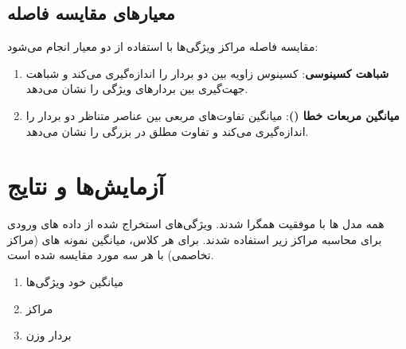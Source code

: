 \documentclass{article}
\begin{document}
\subsection{معیارهای مقایسه فاصله}
مقایسه فاصله مراکز ویژگی‌ها با استفاده از دو معیار انجام می‌شود:
\begin{enumerate}
    \item \textbf{شباهت کسینوسی}: کسینوس زاویه بین دو بردار را اندازه‌گیری می‌کند و شباهت جهت‌گیری بین بردارهای ویژگی را نشان می‌دهد.
    \item \textbf{میانگین مربعات خطا ()}: میانگین تفاوت‌های مربعی بین عناصر متناظر دو بردار را اندازه‌گیری می‌کند و تفاوت مطلق در بزرگی را نشان می‌دهد.
\end{enumerate}

\section{آزمایش‌ها و نتایج}
همه مدل ها با موفقیت همگرا شدند.
ویژگی‌های استخراج شده از داده های ورودی برای محاسبه مراکز زیر استفاده شدند. برای هر کلاس، میانگین نمونه های  (مراکز تخاصمی) با هر سه مورد مقایسه شده است.

\begin{enumerate}
    \item میانگین خود ویژگی‌ها 
    \item مراکز 
    \item بردار وزن
\end{enumerate}

\end{document}
